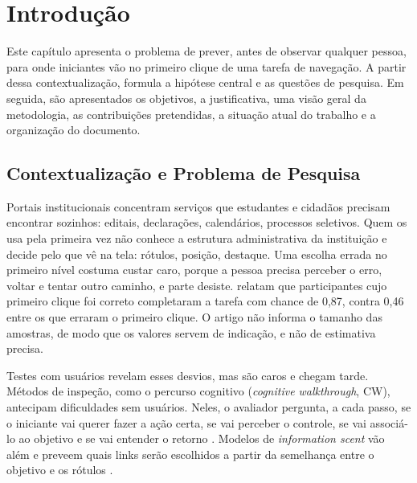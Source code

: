 \documentclass[12pt,oneside,a4paper,chapter=TITLE,english,brazil]{abntex2}
\begin{document}
\tableofcontents*
\cleardoublepage

\textual
\hypersetup{pageanchor=true}
\sloppy

\chapter{Introdução}
\label{cap:intro}

Este capítulo apresenta o problema de prever, antes de observar qualquer pessoa, para onde iniciantes vão no primeiro clique de uma tarefa de navegação. A partir dessa contextualização, formula a hipótese central e as questões de pesquisa. Em seguida, são apresentados os objetivos, a justificativa, uma visão geral da metodologia, as contribuições pretendidas, a situação atual do trabalho e a organização do documento.

\section{Contextualização e Problema de Pesquisa}
\label{sec:contexto}

Portais institucionais concentram serviços que estudantes e cidadãos precisam encontrar sozinhos: editais, declarações, calendários, processos seletivos. Quem os usa pela primeira vez não conhece a estrutura administrativa da instituição e decide pelo que vê na tela: rótulos, posição, destaque. Uma escolha errada no primeiro nível costuma custar caro, porque a pessoa precisa perceber o erro, voltar e tentar outro caminho, e parte desiste.  relatam que participantes cujo primeiro clique foi correto completaram a tarefa com chance de 0,87, contra 0,46 entre os que erraram o primeiro clique. O artigo não informa o tamanho das amostras, de modo que os valores servem de indicação, e não de estimativa precisa.

Testes com usuários revelam esses desvios, mas são caros e chegam tarde. Métodos de inspeção, como o percurso cognitivo (\textit{cognitive walkthrough}, CW), antecipam dificuldades sem usuários. Neles, o avaliador pergunta, a cada passo, se o iniciante vai querer fazer a ação certa, se vai perceber o controle, se vai associá-lo ao objetivo e se vai entender o retorno \cite{polson1992cw,wharton1994cw}. Modelos de \textit{information scent} vão além e preveem quais links serão escolhidos a partir da semelhança entre o objetivo e os rótulos \cite{pirolli1999foraging,blackmon2002cww,fu2007snifact}.
\end{document}
